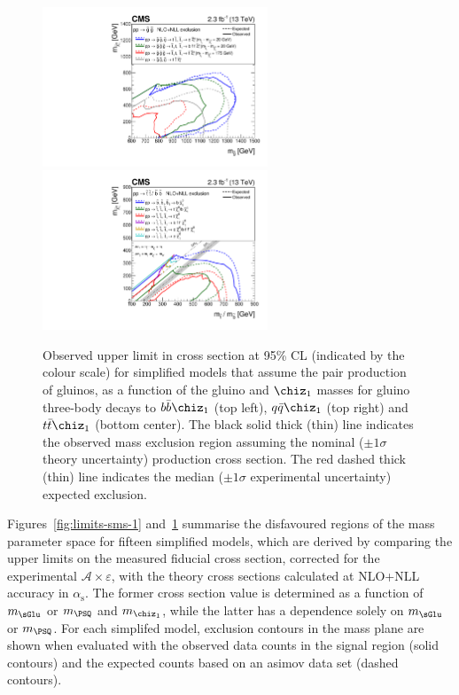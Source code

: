 \begin{figure}[!h]
  \begin{center}
    \includegraphics[width=0.6\textwidth]{figures/limits/v1/naturalWT1SUMMARY.pdf}
    \includegraphics[width=0.6\textwidth]{figures/limits/v1/allThirdGenSUMMARY.pdf} 
    \caption{Observed upper limit in cross section at 95\% CL
      (indicated by the colour scale) for simplified models that
      assume the pair production of gluinos, as a function of the
      gluino and $\chiz_{1}$ masses for gluino three-body decays to
      $b\bar{b}\chiz_{1}$ (top left), $q\bar{q}\chiz_{1}$ (top right) and $t\bar{t}\chiz_{1}$ (bottom center). 
      The black solid thick (thin) line indicates the observed mass
      exclusion region assuming the nominal (${\pm}1 \sigma$ theory
      uncertainty) production cross section. The red dashed thick
      (thin) line indicates the median (${\pm}1 \sigma$ experimental
      uncertainty) expected exclusion.
    }
    \label{fig:limits-sms-2} 
  \end{center}
\end{figure}

Figures~\ref{fig:limits-sms-1} and~\ref{fig:limits-sms-2} summarise
the disfavoured regions of the mass parameter space for fifteen
simplified models, which are derived by comparing the upper limits on
the measured fiducial cross section, corrected for the experimental
$\mathcal{A}\times\varepsilon$, with the theory cross sections
calculated at NLO+NLL accuracy in $\alpha_\text{s}$. The former cross
section value is determined as a function of $m_{\sGlu}$ or $m_{\PSQ}$
and $m_{\chiz_1}$, while the latter has a dependence solely on
$m_{\sGlu}$ or $m_{\PSQ}$. For each simplifed model, exclusion
contours in the mass plane are shown when evaluated with the observed
data counts in the signal region (solid contours) and the expected
counts based on an asimov data set (dashed
contours). 

